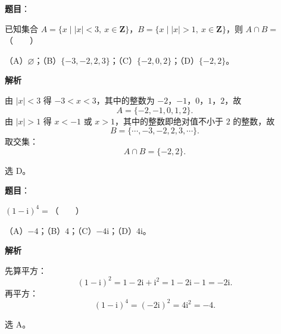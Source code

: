 

\begin{answer}

\textbf{题目}：

已知集合 $A=\{x\mid |x|<3,\ x\in\mathbf Z\}$，$B=\{x\mid |x|>1,\ x\in\mathbf Z\}$，则 $A\cap B=$\mbox{（　　）}

（A）$\varnothing$；（B）$\{-3,-2,2,3\}$；（C）$\{-2,0,2\}$；（D）$\{-2,2\}$。

\textbf{解析}

由 $|x|<3$ 得 $-3<x<3$，其中的整数为 $-2$，$-1$，$0$，$1$，$2$，故
\nopagebreak[4]
\[A=\{-2,-1,0,1,2\}.\]
由 $|x|>1$ 得 $x<-1$ 或 $x>1$，其中的整数即绝对值不小于 $2$ 的整数，故
\nopagebreak[4]
\[B=\{\cdots,-3,-2,2,3,\cdots\}.\]
取交集：
\nopagebreak[4]
\[A\cap B=\{-2,2\}.\]

选 D。


\end{answer}
\begin{answer}

\textbf{题目}：

$(1-\mathrm i)^4=$\mbox{（　　）}

（A）$-4$；（B）$4$；（C）$-4\mathrm i$；（D）$4\mathrm i$。

\textbf{解析}

先算平方：
\nopagebreak[4]
\[(1-\mathrm i)^2=1-2\mathrm i+\mathrm i^2=1-2\mathrm i-1=-2\mathrm i .\]
再平方：
\nopagebreak[4]
\[(1-\mathrm i)^4=\left(-2\mathrm i\right)^2=4\mathrm i^2=-4 .\]

选 A。


\end{answer}
